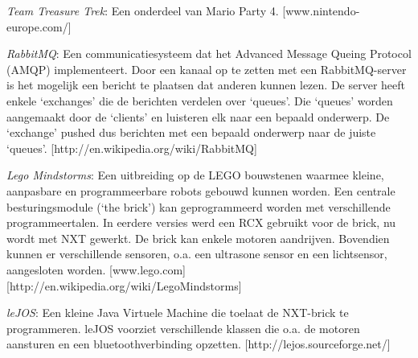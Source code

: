 \documentclass[tt3]{penoverslag}
\begin{document}
\begin{thebibliography}{9}

\textit{Team Treasure Trek}: Een onderdeel van Mario Party 4. \mbox{[www.nintendo-europe.com/]}

\textit{RabbitMQ}: Een communicatiesysteem dat het Advanced Message Queing Protocol (AMQP) implementeert. Door een kanaal op te zetten met een RabbitMQ-server is het mogelijk een bericht te plaatsen dat anderen kunnen lezen. De server heeft enkele `exchanges' die de berichten verdelen over `queues'. Die `queues' worden aangemaakt door de `clients' en luisteren elk naar een bepaald onderwerp. De `exchange' pushed dus berichten met een bepaald onderwerp naar de juiste `queues'.
\mbox{[http://en.wikipedia.org/wiki/RabbitMQ]}

\textit{Lego Mindstorms}:  Een uitbreiding op de LEGO bouwstenen waarmee kleine, aanpasbare en programmeerbare robots gebouwd kunnen worden. Een centrale besturingsmodule (`the brick') kan geprogrammeerd worden met verschillende programmeertalen. In eerdere versies werd een RCX gebruikt voor de brick, nu wordt met NXT gewerkt. De brick kan enkele motoren aandrijven. Bovendien kunnen er verschillende sensoren, o.a. een ultrasone sensor en een lichtsensor, aangesloten worden.  \mbox{[www.lego.com]} \mbox{[http://en.wikipedia.org/wiki/Lego\textendash Mindstorms]}

\textit{leJOS}: Een kleine Java Virtuele Machine die toelaat de NXT-brick te programmeren. leJOS voorziet verschillende klassen die o.a. de motoren aansturen en een bluetoothverbinding opzetten.  \mbox{[http://lejos.sourceforge.net/]}



\end{thebibliography}
\end{document}
